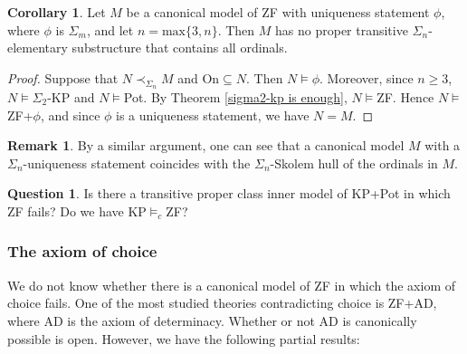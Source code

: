 \documentclass[a4paper,12pt]{amsart}
\theoremstyle{definition}
\newtheorem{corollary}[fact]{Corollary}
\newtheorem{remark}[fact]{Remark}
\newtheorem{question}[fact]{Question}
\begin{document}
\begin{corollary}
Let $M$ be a canonical model of ZF with uniqueness statement $\phi$, where $\phi$ is $\Sigma_m$, and let $n=\text{max}\{3,n\}$. Then $M$ has no proper transitive $\Sigma_{n}$-elementary substructure that contains all ordinals. 
\end{corollary}
\begin{proof}
Suppose that $N\prec_{\Sigma_{n}}M$ and $\text{On}\subseteq N$. Then $N\models\phi$. Moreover, since $n\geq 3$, $N\models\Sigma_2$-KP and $N\models$Pot. By Theorem \ref{sigma2-kp is enough}, $N\models$ZF. Hence $N\models$ZF+$\phi$, and since $\phi$ is a uniqueness statement, we have $N=M$.
\end{proof}

\begin{remark}
By a similar argument, one can see that a canonical model $M$ with a $\Sigma_n$-uniqueness statement coincides with the $\Sigma_n$-Skolem hull of the ordinals in $M$. 
\end{remark}

\begin{question}
Is there a transitive proper class inner model of KP+Pot in which ZF fails? 
Do we have KP$\models_{c}$ZF?
\end{question}


\subsubsection{The axiom of choice}

We do not know whether there is a canonical model of ZF in which the axiom of choice fails. 
One of the most studied theories contradicting choice is ZF+AD, where AD is the axiom of determinacy. 
Whether or not AD is canonically possible is open. 
However, we have the following partial results:
\end{document}
